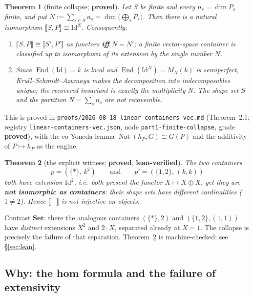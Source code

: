 \documentclass[11pt]{article}
\theoremstyle{plain}
\newtheorem{theorem}{Theorem}
\theoremstyle{definition}
\theoremstyle{remark}
\newcommand{\Set}{\mathbf{Set}}
\newcommand{\ext}[1]{\llbracket #1 \rrbracket}
\DeclareMathOperator{\Nat}{Nat}
\DeclareMathOperator{\End}{End}
\DeclareMathOperator{\dm}{dim}
\begin{document}
\begin{theorem}[finite collapse; \textbf{proved}]
\label{thm:collapse}
Let $S$ be finite and every $n_s=\dm P_s$ finite, and put $N:=\sum_{s\in S}n_s=\dm\bigl(\bigoplus_s
P_s\bigr)$. Then there is a natural isomorphism $\ext{S,P}\cong\mathrm{Id}^N$. Consequently:
\begin{enumerate}
\item $\ext{S,P}\cong\ext{S',P'}$ as functors \textbf{iff} $N=N'$; a finite vector-space container
is classified up to isomorphism of its extension by the single number $N$.
\item Since $\End(\mathrm{Id})=k$ is local and $\End(\mathrm{Id}^N)=M_N(k)$ is semiperfect,
Krull--Schmidt--Azumaya makes the decomposition into indecomposables unique; the recovered invariant
is exactly the multiplicity $N$. The shape set $S$ and the partition $N=\sum_s n_s$ are \emph{not}
recoverable.
\end{enumerate}
\end{theorem}

\noindent This is proved in \texttt{proofs/2026-08-18-linear-containers-vec.md} (Theorem~2.1;
registry \texttt{linear-containers-vec.json}, node \texttt{part1-finite-collapse}, grade
\textbf{proved}), with the co-Yoneda lemma $\Nat(h_P,G)\cong G(P)$ and the additivity of
$P\mapsto h_P$ as the engine.

\begin{theorem}[the explicit witness; \textbf{proved}, \textbf{lean-verified}]
\label{thm:witness}
The two containers
\[
   p=(\{\ast\},\,k^2)\qquad\text{and}\qquad p'=(\{1,2\},\,(k,k))
\]
both have extension $\mathrm{Id}^2$, i.e.\ both present the functor $X\mapsto X\oplus X$, yet they
are \textbf{not isomorphic as containers}: their shape sets have different cardinalities
($1\neq2$). Hence $\ext{-}$ is \emph{not injective on objects}.
\end{theorem}

\noindent Contrast $\Set$: there the analogous containers $(\{\ast\},2)$ and $(\{1,2\},(1,1))$ have
\emph{distinct} extensions $X^2$ and $2\cdot X$, separated already at $X=1$. The collapse is
precisely the failure of that separation. Theorem~\ref{thm:witness} is machine-checked; see
\S\ref{sec:lean}.

\subsection{Why: the hom formula and the failure of extensivity}
\end{document}
